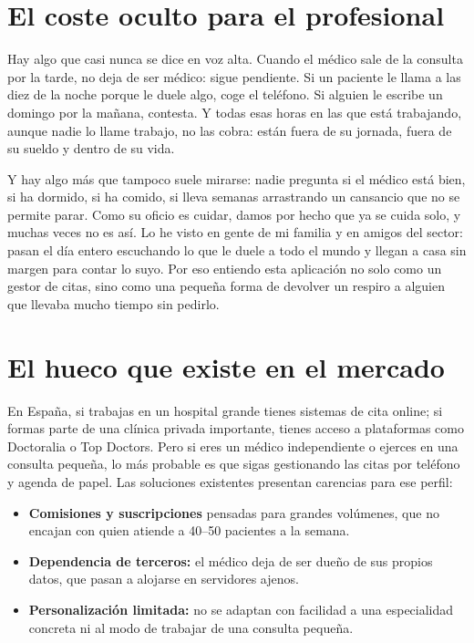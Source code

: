 \documentclass[12pt,a4paper]{report}
\begin{document}
\section{El coste oculto para el profesional}

Hay algo que casi nunca se dice en voz alta. Cuando el médico sale de la consulta por la tarde, no deja de ser médico: sigue pendiente. Si un paciente le llama a las diez de la noche porque le duele algo, coge el teléfono. Si alguien le escribe un domingo por la mañana, contesta. Y todas esas horas en las que está trabajando, aunque nadie lo llame trabajo, no las cobra: están fuera de su jornada, fuera de su sueldo y dentro de su vida.

Y hay algo más que tampoco suele mirarse: nadie pregunta si el médico está bien, si ha dormido, si ha comido, si lleva semanas arrastrando un cansancio que no se permite parar. Como su oficio es cuidar, damos por hecho que ya se cuida solo, y muchas veces no es así. Lo he visto en gente de mi familia y en amigos del sector: pasan el día entero escuchando lo que le duele a todo el mundo y llegan a casa sin margen para contar lo suyo. Por eso entiendo esta aplicación no solo como un gestor de citas, sino como una pequeña forma de devolver un respiro a alguien que llevaba mucho tiempo sin pedirlo.

\section{El hueco que existe en el mercado}

En España, si trabajas en un hospital grande tienes sistemas de cita online; si formas parte de una clínica privada importante, tienes acceso a plataformas como Doctoralia o Top Doctors. Pero si eres un médico independiente o ejerces en una consulta pequeña, lo más probable es que sigas gestionando las citas por teléfono y agenda de papel. Las soluciones existentes presentan carencias para ese perfil:

\begin{itemize}
  \item \textbf{Comisiones y suscripciones} pensadas para grandes volúmenes, que no encajan con quien atiende a 40--50 pacientes a la semana.
  \item \textbf{Dependencia de terceros:} el médico deja de ser dueño de sus propios datos, que pasan a alojarse en servidores ajenos.
  \item \textbf{Personalización limitada:} no se adaptan con facilidad a una especialidad concreta ni al modo de trabajar de una consulta pequeña.
\end{itemize}
\end{document}
